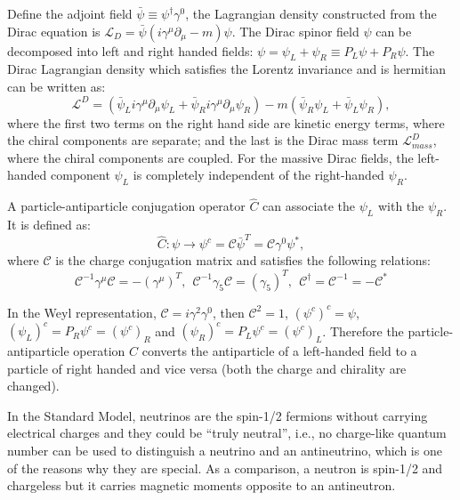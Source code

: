 Define the adjoint field $\bar{\psi}\equiv \psi^{\dag}\gamma^0$, the Lagrangian density constructed from the Dirac equation is $\mathcal{L}_D = \bar\psi(i\gamma^\mu\partial_\mu-m)\psi$. The Dirac spinor field $\psi$ can be decomposed into left and right handed fields: $\psi=\psi_L+\psi_R\equiv P_L\psi+P_R\psi$. The Dirac Lagrangian density which satisfies the Lorentz invariance and is hermitian can be written as\cite{zee2010quantum}:
\begin{equation}\label{diracLagrange}
\mathcal{L}^D = (\bar{\psi}_L i\gamma^\mu\partial_\mu\psi_L+\bar{\psi}_R i\gamma^\mu\partial_\mu\psi_R)-m(\bar{\psi}_R\psi_L+\bar{\psi}_L\psi_R),
\end{equation} 
where the first two terms on the right hand side are kinetic energy terms, where the chiral components are separate; and the last is the Dirac mass term $\mathcal{L}^{D}_{mass}$, where the chiral components are coupled. For the massive Dirac fields, the left-handed component $\psi_L$ is completely independent of the right-handed $\psi_R$. 

A particle-antiparticle conjugation operator $\hat C$ can associate the $\psi_L$ with the $\psi_R$. It is defined as\cite{akhmedov2014majorana}:
\begin{equation}
\hat C: \psi\to \psi^c=\mathcal{C}\bar\psi^T=\mathcal{C}\gamma^0\psi^*,
\end{equation}
where $\mathcal C$ is the charge conjugation matrix and satisfies the following relations:
\begin{equation}
\mathcal C^{-1}\gamma^\mu\mathcal C=-(\gamma^\mu)^T,~~\mathcal{C}^{-1}\gamma_5\mathcal{C}=(\gamma_5)^T,~~\mathcal{C}^\dagger = \mathcal{C}^{-1}=-\mathcal{C}^*
\end{equation}

In the Weyl representation, $\mathcal{C}=i\gamma^2\gamma^0$, then $\mathcal {C}^2=1$, $(\psi^c)^c=\psi$, $(\psi_L)^c=P_R\psi^c=(\psi^c)_R$ and $(\psi_R)^c=P_L\psi^c=(\psi^c)_L$. Therefore the particle-antiparticle operation $\hat C$ converts the antiparticle of a left-handed field to a particle of right handed and vice versa (both the charge and chirality are changed).

In the Standard Model, neutrinos are the spin-1/2 fermions without carrying electrical charges and they could be ``truly neutral'', i.e., no charge-like quantum number can be used to distinguish a neutrino and an antineutrino, which is one of the reasons why they are special. As a comparison, a neutron is spin-1/2 and chargeless but it carries magnetic moments opposite to an antineutron\cite{akhmedov2014majorana}.

